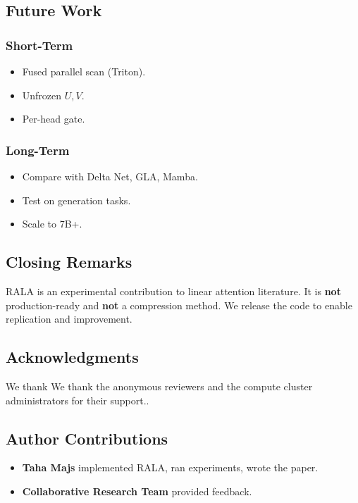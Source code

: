 \subsection{Future Work}

\subsubsection{Short-Term}

\begin{itemize}
\item Fused parallel scan (Triton).
\item Unfrozen $U, V$.
\item Per-head gate.

\end{itemize}
\subsubsection{Long-Term}

\begin{itemize}
\item Compare with Delta Net, GLA, Mamba.
\item Test on generation tasks.
\item Scale to 7B+.

\end{itemize}
\subsection{Closing Remarks}

RALA is an experimental contribution to linear attention literature. It is 
\textbf{not} production-ready and \textbf{not} a compression method. We release the 
code to enable replication and improvement.

\subsection{Acknowledgments}

We thank We thank the anonymous reviewers and the compute cluster administrators for their support..

\subsection{Author Contributions}

\begin{itemize}
\item \textbf{Taha Majs} implemented RALA, ran experiments, wrote the paper.
\item \textbf{Collaborative Research Team} provided feedback.

\end{itemize}
